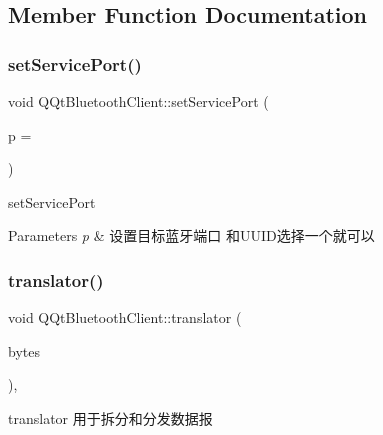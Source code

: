 \subsection{Member Function Documentation}
\mbox{\label{class_q_qt_bluetooth_client_a72a544fcb28b317772038cd622cd3d52}} 
\subsubsection{\texorpdfstring{set\+Service\+Port()}{setServicePort()}}
{\footnotesize\ttfamily void Q\+Qt\+Bluetooth\+Client\+::set\+Service\+Port (\begin{DoxyParamCaption}\item[{quint16}]{p = {} }\end{DoxyParamCaption})\hspace{0.3cm}{\ttfamily [inline]}}



set\+Service\+Port 


\begin{DoxyParams}{Parameters}
{\em p} & 设置目标蓝牙端口 和\+U\+U\+I\+D选择一个就可以 \\
\hline
\end{DoxyParams}
\mbox{\label{class_q_qt_bluetooth_client_a5494c96ebf9c8a489000c1d44e059e85}} 
\subsubsection{\texorpdfstring{translator()}{translator()}}
{\footnotesize\ttfamily void Q\+Qt\+Bluetooth\+Client\+::translator (\begin{DoxyParamCaption}\item[{const Q\+Byte\+Array \&}]{bytes }\end{DoxyParamCaption})\hspace{0.3cm}{\ttfamily [protected]}, {\ttfamily [virtual]}}



translator 用于拆分和分发数据报 



